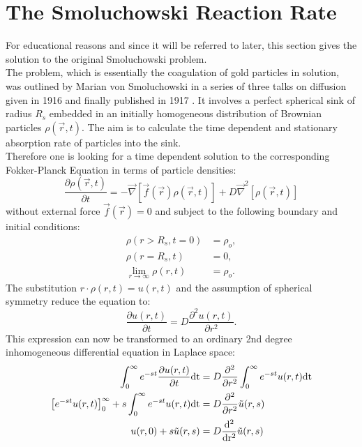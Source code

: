 \section{The Smoluchowski Reaction Rate}
\label{K_s}
For educational reasons and since it will be referred to later, this section gives the solution to the original Smoluchowski problem. \\
The problem, which is essentially the coagulation of gold particles in solution, was outlined by Marian von Smoluchowski in a series of three talks on diffusion given in 1916 \cite{Smoluchowski1916} and finally published in 1917 \cite{Smoluchowski1917a}. It involves a perfect spherical sink of radius $R_s$ embedded in an initially homogeneous distribution of Brownian particles $\rho(\vec{r},t)$. The aim is to calculate the time dependent and stationary absorption rate of particles into the sink. \\
Therefore one is looking for a time dependent solution to the corresponding Fokker-Planck Equation in terms of particle densities:
\begin{equation}
        \frac{\partial \rho(\vec{r},t)}{\partial t} = - \vec \nabla \left[ \vec f(\vec{r})\rho(\vec{r},t) \right] + D\vec \nabla ^2 \left[\rho(\vec{r},t) \right] 
    \label{FPE3}
\end{equation}
without external force $\vec{f}(\vec{r})=0$ and subject to the following boundary and initial conditions:
\begin{align}
    \rho(r > R_s, t = 0) &= \rho_o, \\
    \rho(r=R_s,t) &= 0, \\
    \lim_{r \rightarrow \infty} \rho(r, t) &= \rho_o.
    \label{BC}
\end{align}
The substitution $r \cdot \rho(r,t) = u(r,t)$ and the assumption of spherical symmetry reduce the equation to:
\begin{equation}
    \frac{\partial u(r,t)}{\partial t} = D \frac{\partial ^2 u(r,t)}{\partial r^2}.
    \label{Simplified FPE}
\end{equation}
This expression can now be transformed to an ordinary 2nd degree inhomogeneous differential equation in Laplace space:
\begin{align}
    \int_0^\infty e^{-st}\frac{\partial u(r,t)}{\partial t} \rm{d} t &= D \frac{\partial ^2 }{\partial r^2} \int_0^\infty e^{-st} u(r,t) \rm{d} t \\
    \left[e^{-st} u(r,t) \right]_0^\infty + s \int_0^\infty e^{-st} u(r,t) \rm{d} t &= D \frac{\partial^2}{\partial r^2} \tilde{u}(r,s)\\
    u(r,0) + s \tilde{u}(r,s) &= D \frac{\rm{d}^2}{\rm{d} r^2} \tilde{u}(r,s)
\end{align}
